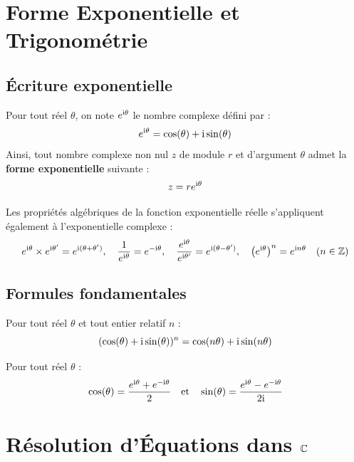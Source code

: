 \section{Forme Exponentielle et Trigonométrie}

\subsection{Écriture exponentielle}

\begin{definition}
Pour tout réel $\theta$, on note $e^{\mathrm{i}\theta}$ le nombre complexe défini par :
\[
e^{\mathrm{i}\theta} = \cos(\theta) + \mathrm{i} \sin(\theta)
\]
Ainsi, tout nombre complexe non nul $z$ de module $r$ et d'argument $\theta$ admet la \textbf{forme exponentielle} suivante :
\[
z = r e^{\mathrm{i}\theta}
\]
\end{definition}

Les propriétés algébriques de la fonction exponentielle réelle s'appliquent également à l'exponentielle complexe :
\[
e^{\mathrm{i}\theta} \times e^{\mathrm{i}\theta'} = e^{\mathrm{i}(\theta+\theta')}, \quad \frac{1}{e^{\mathrm{i}\theta}} = e^{-\mathrm{i}\theta}, \quad \frac{e^{\mathrm{i}\theta}}{e^{\mathrm{i}\theta'}} = e^{\mathrm{i}(\theta-\theta')}, \quad \left(e^{\mathrm{i}\theta}\right)^n = e^{\mathrm{i} n\theta}
\quad (n \in \mathbb{Z})
\]

\subsection{Formules fondamentales}

\begin{propriete}
Pour tout réel $\theta$ et tout entier relatif $n$ :
\[
(\cos(\theta) + \mathrm{i} \sin(\theta))^n = \cos(n\theta) + \mathrm{i} \sin(n\theta)
\]
\end{propriete}

\begin{propriete}
Pour tout réel $\theta$ :
\[
\cos(\theta) = \frac{e^{\mathrm{i}\theta} + e^{-\mathrm{i}\theta}}{2} \quad \text{et} \quad \sin(\theta) = \frac{e^{\mathrm{i}\theta} - e^{-\mathrm{i}\theta}}{2\mathrm{i}}
\]
\end{propriete}

\section{Résolution d'Équations dans $\mathbb{C}$}

